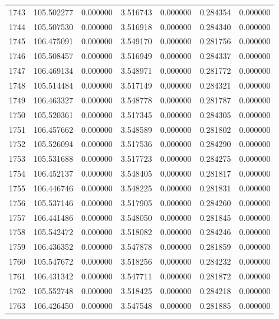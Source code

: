 \begin{tabular}{rrrrrrr}
1743 & 105.502277 &    0.000000 &  3.516743 &   0.000000 &   0.284354 &  0.000000 \\
1744 & 105.507530 &    0.000000 &  3.516918 &   0.000000 &   0.284340 &  0.000000 \\
1745 & 106.475091 &    0.000000 &  3.549170 &   0.000000 &   0.281756 &  0.000000 \\
1746 & 105.508457 &    0.000000 &  3.516949 &   0.000000 &   0.284337 &  0.000000 \\
1747 & 106.469134 &    0.000000 &  3.548971 &   0.000000 &   0.281772 &  0.000000 \\
1748 & 105.514484 &    0.000000 &  3.517149 &   0.000000 &   0.284321 &  0.000000 \\
1749 & 106.463327 &    0.000000 &  3.548778 &   0.000000 &   0.281787 &  0.000000 \\
1750 & 105.520361 &    0.000000 &  3.517345 &   0.000000 &   0.284305 &  0.000000 \\
1751 & 106.457662 &    0.000000 &  3.548589 &   0.000000 &   0.281802 &  0.000000 \\
1752 & 105.526094 &    0.000000 &  3.517536 &   0.000000 &   0.284290 &  0.000000 \\
1753 & 105.531688 &    0.000000 &  3.517723 &   0.000000 &   0.284275 &  0.000000 \\
1754 & 106.452137 &    0.000000 &  3.548405 &   0.000000 &   0.281817 &  0.000000 \\
1755 & 106.446746 &    0.000000 &  3.548225 &   0.000000 &   0.281831 &  0.000000 \\
1756 & 105.537146 &    0.000000 &  3.517905 &   0.000000 &   0.284260 &  0.000000 \\
1757 & 106.441486 &    0.000000 &  3.548050 &   0.000000 &   0.281845 &  0.000000 \\
1758 & 105.542472 &    0.000000 &  3.518082 &   0.000000 &   0.284246 &  0.000000 \\
1759 & 106.436352 &    0.000000 &  3.547878 &   0.000000 &   0.281859 &  0.000000 \\
1760 & 105.547672 &    0.000000 &  3.518256 &   0.000000 &   0.284232 &  0.000000 \\
1761 & 106.431342 &    0.000000 &  3.547711 &   0.000000 &   0.281872 &  0.000000 \\
1762 & 105.552748 &    0.000000 &  3.518425 &   0.000000 &   0.284218 &  0.000000 \\
1763 & 106.426450 &    0.000000 &  3.547548 &   0.000000 &   0.281885 &  0.000000 \\

\end{tabular}
